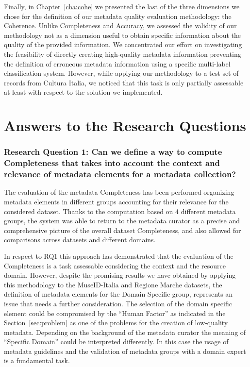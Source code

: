 \documentclass[epsfig,a4paper,12pt,titlepage]{book}
\begin{document}
Finally, in Chapter~\ref{cha:cohe} we presented the last of the three dimensions we chose for the definition of our metadata quality evaluation methodology: the Coherence. Unlike Completeness and Accuracy, we assessed the validity of our methodology not as a dimension useful to obtain specific information about the quality of the provided information. We concentrated our effort on investigating the feasibility of directly creating high-quality metadata information preventing the definition of erroneous metadata information using a specific multi-label classification system. However, while applying our methodology to a test set of records from Cultura Italia, we noticed that this task is only partially assessable at least with respect to the solution we implemented.


\section{Answers to the Research Questions}
\subsubsection{\textbf{Research Question 1: Can  we  define  a  way  to  compute  Completeness  that  takes  into  account the context and relevance of metadata elements for a metadata collection?}}
The evaluation of the metadata Completeness has been performed organizing metadata elements in different groups accounting for their relevance for the considered dataset. 
Thanks to the computation based on 4 different metadata groups, the system was able to return to the metadata curator as a precise and comprehensive picture of the overall dataset Completeness, and also allowed for comparisons across datasets and different domains. 

In respect to RQ1 this approach has demonstrated that the evaluation of the Completeness is a task assessable considering the context and the resource domain.
However, despite the promising results we have obtained by applying this methodology to the MuseID-Italia and Regione Marche datasets,  the definition of metadata elements for the Domain Specific group, represents an issue that needs a further consideration. The selection of the domain specific element could be compromised by the ``Human Factor'' as indicated in the Section~\ref{sec:problem} as one of the problems for the creation of low-quality metadata. Depending on the background of the metadata curator the meaning of ``Specific Domain'' could be interpreted differently. 
In this case the usage of metadata guidelines and the validation of metadata groups with a domain expert is a fundamental task.
\end{document}
